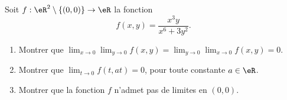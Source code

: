 \begin{exercice}\label{exodevoir1-0006}

Soit $f: \eR^2\setminus\{(0,0)\}\to \eR $ la fonction
\begin{equation}
  f(x,y)=\frac{x^3y}{x^6+3y^2}.
\end{equation}
\begin{enumerate}
\item Montrer que $\displaystyle \lim_{x\to 0}\lim_{y\to 0} f(x,y)=\lim_{y\to 0}\lim_{x\to 0} f(x,y)= 0$.
\item Montrer que $\displaystyle \lim_{t\to 0}f(t,at)=0$, pour toute constante  $a\in\eR$. 
\item Montrer que la fonction $f$ n'admet pas de limites en \( (0,0)\).
\end{enumerate}
	
\end{exercice}
